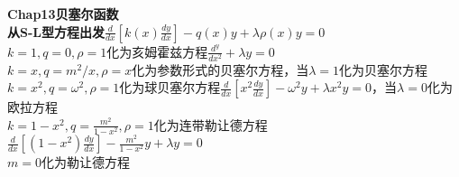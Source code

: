\documentclass[10pt,a4paper]{article}
\begin{document}
\begin{multicols}{2}
\textbf{Chap13贝塞尔函数}\\\tiny%
\textbf{从S-L型方程出发}$\frac{d}{dx}[k(x)\frac{dy}{dx}]-q(x)y+\lambda\rho(x)y=0$\\
$k=1,q=0,\rho=1$化为亥姆霍兹方程$\frac{d^y}{dx^2}+\lambda y=0$\\
$k=x,q=m^2/x,\rho=x$化为参数形式的贝塞尔方程，当$\lambda=1$化为贝塞尔方程\\
$k=x^2,q=\omega^2,\rho=1$化为球贝塞尔方程$\frac{d}{dx}[x^2\frac{dy}{dx}]-\omega^2y+\lambda x^2y=0$，当$\lambda=0$化为欧拉方程\\
$k=1-x^2,q=\frac{m^2}{1-x^2},\rho=1$化为连带勒让德方程$\frac{d}{dx}[(1-x^2)\frac{dy}{dx}]-\frac{m^2}{1-x^2}y+\lambda y=0$\\
\indent{}$m=0$化为勒让德方程\scriptsize\\

\end{multicols}
\end{document}
